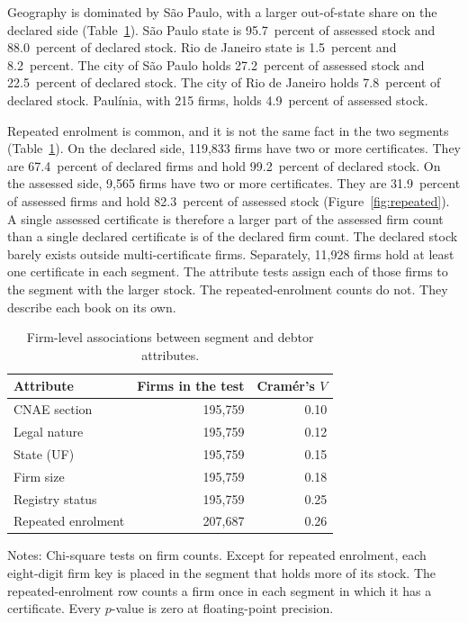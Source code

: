 Geography is dominated by S\~ao Paulo, with a larger out-of-state share on the declared side (Table~\ref{tab:attr}).
S\~ao Paulo state is 95.7~percent of assessed stock and 88.0~percent of declared stock.
Rio de Janeiro state is 1.5~percent and 8.2~percent.
The city of S\~ao Paulo holds 27.2~percent of assessed stock and 22.5~percent of declared stock.
The city of Rio de Janeiro holds 7.8~percent of declared stock.
Paul\'inia, with 215 firms, holds 4.9~percent of assessed stock.

Repeated enrolment is common, and it is not the same fact in the two segments (Table~\ref{tab:attr}).
On the declared side, 119,833 firms have two or more certificates.
They are 67.4~percent of declared firms and hold 99.2~percent of declared stock.
On the assessed side, 9,565 firms have two or more certificates.
They are 31.9~percent of assessed firms and hold 82.3~percent of assessed stock (Figure~\ref{fig:repeated}).
A single assessed certificate is therefore a larger part of the assessed firm count than a single declared certificate is of the declared firm count.
The declared stock barely exists outside multi-certificate firms.
Separately, 11,928 firms hold at least one certificate in each segment.
The attribute tests assign each of those firms to the segment with the larger stock.
The repeated-enrolment counts do not.
They describe each book on its own.

\begin{table}[t]
\centering
\caption{Firm-level associations between segment and debtor attributes.}\label{tab:attr}
\begin{tabular}{lrr}
\toprule
Attribute & Firms in the test & Cram\'er's $V$ \\
\midrule
CNAE section & 195,759 & 0.10 \\
Legal nature & 195,759 & 0.12 \\
State (UF) & 195,759 & 0.15 \\
Firm size & 195,759 & 0.18 \\
Registry status & 195,759 & 0.25 \\
Repeated enrolment & 207,687 & 0.26 \\
\bottomrule
\end{tabular}

\vspace{0.4em}
\begin{minipage}{0.95\textwidth}
\footnotesize
Notes: Chi-square tests on firm counts.
Except for repeated enrolment, each eight-digit firm key is placed in the segment that holds more of its stock.
The repeated-enrolment row counts a firm once in each segment in which it has a certificate.
Every $p$-value is zero at floating-point precision.
\end{minipage}
\end{table}

